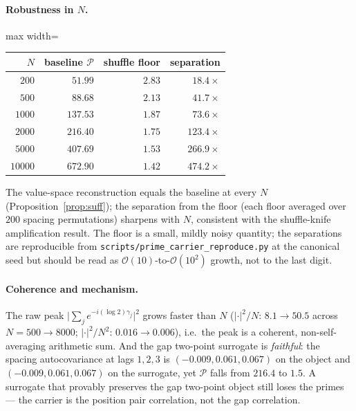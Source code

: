 \documentclass[11pt]{article}
\begin{document}
\paragraph{Robustness in $N$.}
\begin{center}
\begin{adjustbox}{max width=\linewidth}\begin{tabular}{rrrr}
\toprule
$N$ & baseline $\mathcal P$ & shuffle floor & separation \\
\midrule
$200$ & $51.99$ & $2.83$ & $18.4\times$ \\
$500$ & $88.68$ & $2.13$ & $41.7\times$ \\
$1000$ & $137.53$ & $1.87$ & $73.6\times$ \\
$2000$ & $216.40$ & $1.75$ & $123.4\times$ \\
$5000$ & $407.69$ & $1.53$ & $266.9\times$ \\
$10000$ & $672.90$ & $1.42$ & $474.2\times$ \\
\bottomrule
\end{tabular}\end{adjustbox}
\end{center}
The value-space reconstruction equals the baseline at every $N$ (Proposition~\ref{prop:suff}); the separation from the floor (each floor averaged over $200$ spacing permutations) sharpens with $N$, consistent with the shuffle-knife amplification result. The floor is a small, mildly noisy quantity; the separations are reproducible from \nolinkurl{scripts/prime_carrier_reproduce.py} at the canonical seed but should be read as $\mathcal O(10)$-to-$\mathcal O(10^2)$ growth, not to the last digit.

\paragraph{Coherence and mechanism.}
The raw peak $\lvert\sum_j e^{-i(\log2)\gamma_j}\rvert^2$ grows faster than $N$ ($\lvert\cdot\rvert^2/N$: $8.1\to50.5$ across $N=500\to8000$; $\lvert\cdot\rvert^2/N^2$: $0.016\to0.006$), i.e.\ the peak is a coherent, non-self-averaging arithmetic sum. And the gap two-point surrogate is \emph{faithful}: the spacing autocovariance at lags $1,2,3$ is $(-0.009,0.061,0.067)$ on the object and $(-0.009,0.061,0.067)$ on the surrogate, yet $\mathcal P$ falls from $216.4$ to $1.5$. A surrogate that provably preserves the gap two-point object still loses the primes --- the carrier is the position pair correlation, not the gap correlation.
\end{document}
